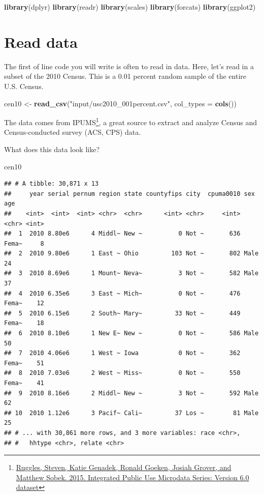 \documentclass[]{book}
\newenvironment{Shaded}{\begin{snugshade}}{\end{snugshade}}
\newcommand{\KeywordTok}[1]{\textcolor[rgb]{0.13,0.29,0.53}{\textbf{#1}}}
\newcommand{\DataTypeTok}[1]{\textcolor[rgb]{0.13,0.29,0.53}{#1}}
\newcommand{\StringTok}[1]{\textcolor[rgb]{0.31,0.60,0.02}{#1}}
\newcommand{\NormalTok}[1]{#1}
\let\rmarkdownfootnote\footnote%
\def\footnote{\protect\rmarkdownfootnote}
\theoremstyle{definition}
\theoremstyle{definition}
\theoremstyle{definition}
\theoremstyle{remark}
\begin{document}
\begin{Shaded}
\begin{Highlighting}[]
\KeywordTok{library}\NormalTok{(dplyr)}
\KeywordTok{library}\NormalTok{(readr)}
\KeywordTok{library}\NormalTok{(scales)}
\KeywordTok{library}\NormalTok{(forcats)}
\KeywordTok{library}\NormalTok{(ggplot2)}
\end{Highlighting}
\end{Shaded}

\section{Read data}\label{read-data}

The first of line code you will write is often to read in data. Here,
let's read in a subset of the 2010 Census. This is a 0.01 percent random
sample of the entire U.S. Census.

\begin{Shaded}
\begin{Highlighting}[]
\NormalTok{cen10 <-}\StringTok{ }\KeywordTok{read_csv}\NormalTok{(}\StringTok{"input/usc2010_001percent.csv"}\NormalTok{, }\DataTypeTok{col_types =} \KeywordTok{cols}\NormalTok{())}
\end{Highlighting}
\end{Shaded}

The data comes from IPUMS\footnote{\href{http://doi.org/10.18128/D010.V6.0}{Ruggles,
  Steven, Katie Genadek, Ronald Goeken, Josiah Grover, and Matthew
  Sobek. 2015. Integrated Public Use Microdata Series: Version 6.0
  dataset}}, a great source to extract and analyze Census and
Census-conducted survey (ACS, CPS) data.

What does this data look like?

\begin{Shaded}
\begin{Highlighting}[]
\NormalTok{cen10}
\end{Highlighting}
\end{Shaded}

\begin{verbatim}
## # A tibble: 30,871 x 13
##     year serial pernum region state countyfips city  cpuma0010 sex     age
##    <int>  <int>  <int> <chr>  <chr>      <int> <chr>     <int> <chr> <int>
##  1  2010 8.80e6      4 Middl~ New ~          0 Not ~       636 Fema~     8
##  2  2010 9.80e6      1 East ~ Ohio         103 Not ~       802 Male     24
##  3  2010 8.69e6      1 Mount~ Neva~          3 Not ~       582 Male     37
##  4  2010 6.35e6      3 East ~ Mich~          0 Not ~       476 Fema~    12
##  5  2010 6.15e6      2 South~ Mary~         33 Not ~       449 Fema~    18
##  6  2010 8.10e6      1 New E~ New ~          0 Not ~       586 Male     50
##  7  2010 4.06e6      1 West ~ Iowa           0 Not ~       362 Fema~    51
##  8  2010 7.03e6      2 West ~ Miss~          0 Not ~       550 Fema~    41
##  9  2010 8.16e6      2 Middl~ New ~          3 Not ~       592 Male     62
## 10  2010 1.12e6      3 Pacif~ Cali~         37 Los ~        81 Male     25
## # ... with 30,861 more rows, and 3 more variables: race <chr>,
## #   hhtype <chr>, relate <chr>
\end{verbatim}
\end{document}
